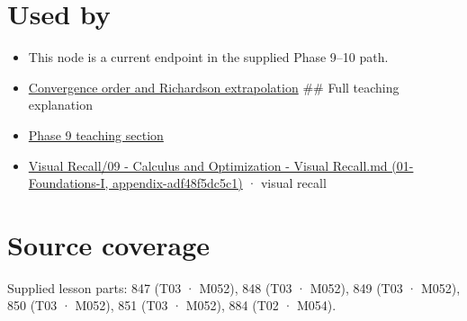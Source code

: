 \section{Used by}\label{appendix-e2d7b4f2161d-used-by}

\begin{itemize}
\item
  This node is a current endpoint in the supplied Phase 9--10 path.
\item
  \hyperref[appendix-aca80b6bf17a]{Convergence order and Richardson extrapolation} \#\# Full teaching explanation
\item
  \href{Continuous\%20Notes/Computing\%20Foundations\%20-\%20From\%20Bits\%20to\%20C++\%20and\%20Systems\%20APIs\#Numerical\%20differentiation\%20and\%20automatic\%20differentiation}{Phase 9 teaching section}
\item
  \href{../01-Foundations-I/main.pdf\#nameddest=appendix-adf48f5dc5c1}{Visual Recall/09 - Calculus and Optimization - Visual Recall.md (01-Foundations-I, appendix-adf48f5dc5c1)} · visual recall
\end{itemize}

\section{Source coverage}\label{appendix-e2d7b4f2161d-source-coverage}

Supplied lesson parts: 847 (T03 · M052), 848 (T03 · M052), 849 (T03 · M052), 850 (T03 · M052), 851 (T03 · M052), 884 (T02 · M054).

